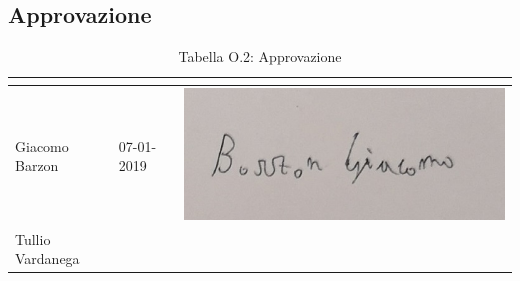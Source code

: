 \subsection{Approvazione}
\renewcommand{\arraystretch}{2}
\begin{table}[H]
\begin{center}
  \begin{tabular}{| M{3cm} | M{3cm} | M{6cm} |}
    \hline
    \textbf{\color{title_text}{Nominativo}} & \textbf{\color{title_text}{Data}} & \textbf{\color{title_text}{Firma}} \\ \hline
    Giacomo Barzon & 07-01-2019 & \includegraphics[scale=0.25]{Res/Firme/giacomo.jpg} \\ \hline
    Tullio Vardanega &  &  \\
    \hline
  \end{tabular}
  \caption{Tabella O.2: Approvazione\label{}}
\end{center}
\end{table}
\renewcommand{\arraystretch}{1}

